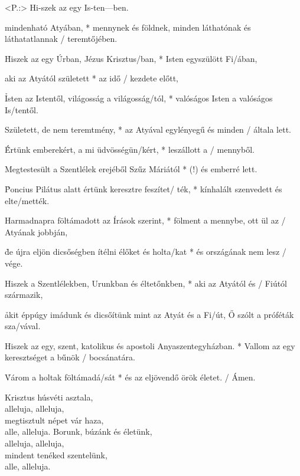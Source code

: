 \documentclass[twoside]{article}
\begin{document}


\begin{gregosheet}
  \addinline{<X-¨-----7--5----3--6---5--tT4R3-3-,,-3-4-[-,-3-£-7-5-‡-4-†-3-,,-¢-0-,-£-5-3-.}
            {   <P.:> Hi-szek az egy Is-ten---ben.}
\end{gregosheet}

\e mindenható Atyában, * mennynek és földnek, minden láthatónak és láthatatlannak / teremtőjében.

\h Hiszek az egy Úrban, Jézus Krisztus/ban, * Isten egyszülött Fi/ában,

\e aki az Atyától született * az idő / kezdete előtt,

\h Isten az Istentől, világosság a világosság/tól, * valóságos Isten a valóságos Is/tentől.

\e Született, de nem teremtmény, * az Atyával egylényegű és minden / általa lett.

\h Értünk emberekért, a mi üdvösségün/kért, * leszállott a / mennyből.

\e  Megtestesült a Szentlélek erejéből Szűz Máriától * (!) és emberré lett.

\h Poncius Pilátus alatt értünk keresztre feszítet/ ték, * kínhalált szenvedett és elte/mették.

\e Harmadnapra föltámadott az Írások szerint, * fölment a mennybe, ott ül az / Atyának jobbján,

\h de újra eljön dicsőségben ítélni élőket és holta/kat * és országának nem lesz / vége.

\e Hiszek a Szentlélekben, Urunkban és éltetőnkben, * aki az Atyától és / Fiútól származik,

\h akit éppúgy imádunk és dicsőítünk mint az Atyát és a Fi/út, Ő szólt a próféták sza/vával.

\e Hiszek az egy, szent, katolikus és apostoli Anyaszentegyházban. * Vallom az egy keresztséget a bűnök / bocsánatára.

\h Várom a holtak föltámadá/sát * és az eljövendő örök életet. / Ámen.


\begin{hymnstanzas}
  Krisztus húsvéti asztala,\\
  alleluja, alleluja,\\
  megtisztult népet vár haza,\\
  alle, alleluja.
\stanzabreak
  Borunk, búzánk és életünk,\\
  alleluja, alleluja,\\
  mindent tenéked szentelünk,\\
  alle, alleluja.
\end{hymnstanzas}
\end{document}
